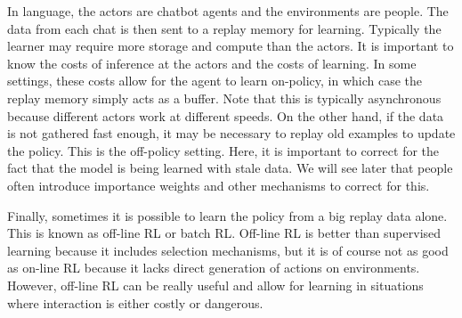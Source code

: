 \documentclass{article}
\begin{document}
In language, the actors are chatbot agents and the environments are people. The data from each chat is then sent to a replay memory for learning. Typically the learner may require more storage and compute than the actors. It is important to know the costs of inference at the actors and the costs of learning. In some settings, these costs allow for the agent to learn on-policy, in which case the replay memory simply acts as a buffer. Note that this is typically asynchronous because different actors work at different speeds. On the other hand, if the data is not gathered fast enough, it may be necessary to replay old examples to update the policy. This is the off-policy setting. Here, it is important to correct for the fact that the model is being learned with stale data. We will see later that people often introduce importance weights and other mechanisms to correct for this.

Finally, sometimes it is possible to learn the policy from a big replay data alone. This is known as off-line RL or batch RL. Off-line RL is better than supervised learning because it includes selection mechanisms, but it is of course not as good as on-line RL because it lacks direct generation of actions on environments. However, off-line RL can be really useful and allow for learning in situations where interaction is either costly or dangerous.
\end{document}
